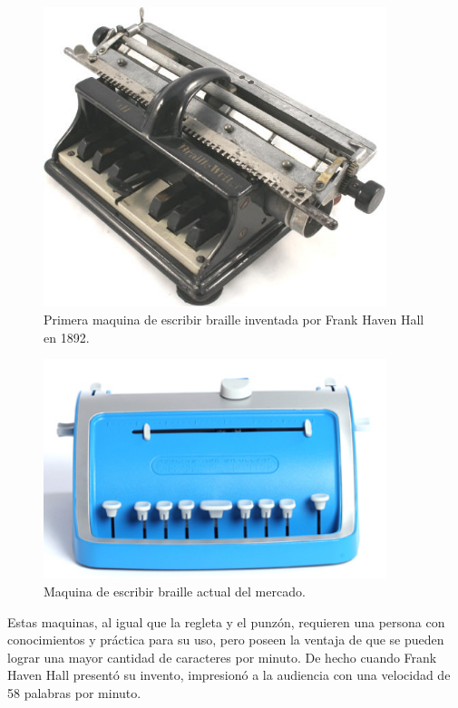 \begin{figure}[htp]
\centering
\includegraphics[width=10cm]{./img/hallbraille-03.png}
\caption{Primera maquina de escribir braille inventada por Frank Haven Hall
en 1892.}
\label{fig:hallbraille-03}
\end{figure}

\begin{figure}[htp]
\centering
\includegraphics[width=10cm]{./img/ng_perkinsaph_brailler.png}
\caption{Maquina de escribir braille actual del mercado.}
\label{fig:ng_perkinsaph_brailler}
\end{figure}

Estas maquinas, al igual que la regleta y el punz\'on, requieren una persona
con conocimientos y pr\'actica para su uso, pero poseen la ventaja de que se
pueden lograr una mayor cantidad de caracteres por minuto. De hecho cuando
Frank Haven Hall present\'o su invento, impresion\'o a la audiencia con una
velocidad de 58 palabras por minuto.



